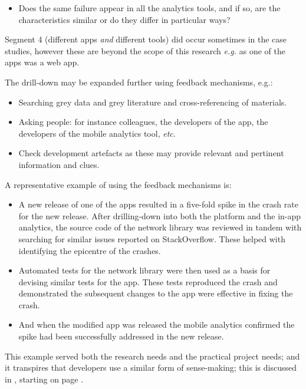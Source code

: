 \begin{itemize}
    \item Does the same failure appear in all the analytics tools, and if so, are the characteristics similar or do they differ in particular ways?
\end{itemize}

Segment 4 (different apps \emph{and} different tools) did occur sometimes in the case studies, however these are beyond the scope of this research \emph{e.g.} as one of the apps was a web app.

The drill-down may be expanded further using feedback mechanisms, e.g.:
 
\begin{itemize}
\itemsep0em
\item Searching grey data and grey literature and cross-referencing of materials.
    \item Asking people: for instance colleagues, the developers of the app, the developers of the mobile analytics tool, \textit{etc}.
    \item Check development artefacts as these may provide relevant and pertinent information and clues.
\end{itemize}

A representative example of using the feedback mechanisms is:

\begin{itemize}
    \item A new release of one of the apps resulted in a five-fold spike in the crash rate for the new release. After drilling-down into both the platform and the in-app analytics, the source code of the network library was reviewed in tandem with searching for similar issues reported on StackOverflow. These helped with identifying the epicentre of the crashes.
    \item Automated tests for the network library were then used as a basis for devising similar tests for the app. These tests reproduced the crash and demonstrated the subsequent changes to the app were effective in fixing the crash.
    \item And when the modified app was released the mobile analytics confirmed the spike had been successfully addressed in the new release.
\end{itemize}

This example served both the research needs and the practical project needs; and it transpires that developers use a similar form of sense-making; this is discussed in , starting on page \pageref{aiu-sensemaking-and-decision-taking-by-developers-section}.

